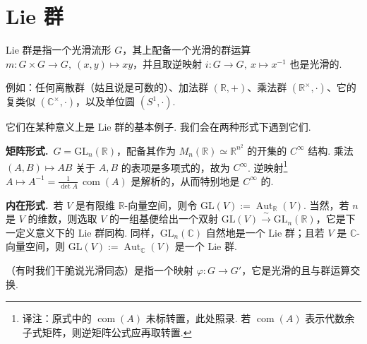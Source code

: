 \section{Lie 群}\label{sec:ssl-1-2}

\begin{definition}\label{def:ssl-1-2-1}
Lie 群是指一个光滑流形 $G$，其上配备一个光滑的群运算 $m\colon G\times G\longrightarrow G,\ (x,y)\mapsto xy$，并且取逆映射 $i\colon G\longrightarrow G,\ x\mapsto x^{-1}$ 也是光滑的.
\end{definition}

\begin{example*}
例如：任何离散群（姑且说是可数的）、加法群 $(\mathbb{R},+)$、乘法群 $(\mathbb{R}^{\times},\cdot)$、它的复类似 $(\mathbb{C}^{\times},\cdot)$，以及单位圆 $(S^{1},\cdot)$.
\end{example*}

\begin{numpara}\label{np:ssl-1-2-2}
它们在某种意义上是 Lie 群的基本例子. 我们会在两种形式下遇到它们.

\textbf{矩阵形式.}\ $G=\mathrm{GL}_n(\mathbb{R})$，配备其作为 $M_n(\mathbb{R})\simeq\mathbb{R}^{n^{2}}$ 的开集的 $C^\infty$ 结构. 乘法 $(A,B)\mapsto AB$ 关于 $A,B$ 的表项是多项式的，故为 $C^\infty$. 逆映射\footnote{译注：原式中的 $\operatorname{com}(A)$ 未标转置，此处照录. 若 $\operatorname{com}(A)$ 表示代数余子式矩阵，则逆矩阵公式应再取转置.} $A\mapsto A^{-1}=\frac{1}{\det A}\,\operatorname{com}(A)$ 是解析的，从而特别地是 $C^\infty$ 的.

\textbf{内在形式.}\ 若 $V$ 是有限维 $\mathbb{R}$-向量空间，则令 $\mathrm{GL}(V):=\operatorname{Aut}_{\mathbb{R}}(V)$. 当然，若 $n$ 是 $V$ 的维数，则选取 $V$ 的一组基便给出一个双射 $\mathrm{GL}(V)\xrightarrow{\ \sim\ }\mathrm{GL}_n(\mathbb{R})$，它是下一定义意义下的 Lie 群同构. 同样，$\mathrm{GL}_n(\mathbb{C})$ 自然地是一个 Lie 群；且若 $V$ 是 $\mathbb{C}$-向量空间，则 $\mathrm{GL}(V):=\operatorname{Aut}_{\mathbb{C}}(V)$ 是一个 Lie 群.
\end{numpara}

\begin{definition}\label{def:ssl-1-2-3}
（有时我们干脆说光滑同态）是指一个映射 $\varphi\colon G\longrightarrow G'$，它是光滑的且与群运算交换.
\end{definition}

